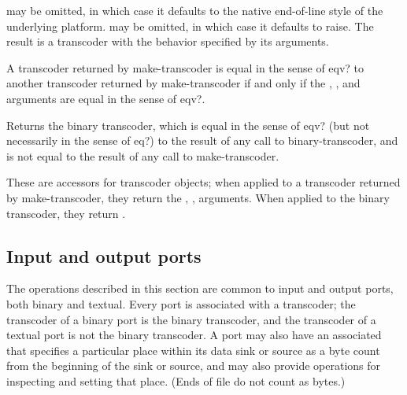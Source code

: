 \begin{entry}{%
}

   may be omitted, in
which case it defaults to the native end-of-line style of the
underlying platform.   may be omitted, in which
case it defaults to {\cf raise}.  The result is a transcoder with the
behavior specified by its arguments.

A transcoder returned by {\cf make-transcoder} is equal in the sense
of {\cf eqv?} to another transcoder returned by {\cf
  make-transcoder} if and only if the , ,
and  arguments are equal in the sense of {\cf
  eqv?}.
\end{entry}

\begin{entry}{%
}

Returns the binary transcoder, which is equal in the sense of
{\cf eqv?} (but not necessarily in the sense of {\cf eq?}) to
the result of any call to {\cf binary-transcoder}, and
is not equal to the result of any call to {\cf make-transcoder}.
\end{entry}

\begin{entry}{%
}

These are accessors for transcoder objects; when applied to a
transcoder returned by {\cf make-transcoder}, they return the
, ,  arguments.
When applied to the binary transcoder, they return \schfalse{}.
\end{entry}

\subsection{Input and output ports}

The operations described in this section are common to input and
output ports, both binary and textual.
Every port is associated with a transcoder;
the transcoder of a binary port is the binary transcoder, and
the transcoder of a textual port is not the binary transcoder.
A port may also have an associated  that
specifies a particular place within its data sink or source as a byte
count from the beginning of the sink or source, and may also provide
operations for inspecting and setting that place.
(Ends of file do not count as bytes.)

